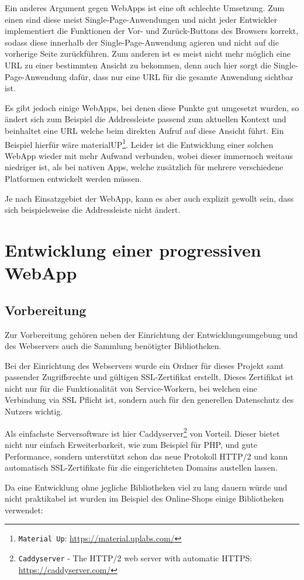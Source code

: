 \documentclass[a4paper,12pt,ngerman,listof=numbered]{scrartcl}      %
\providecommand{\inlinecode}[1]{\texttt{#1}}
\begin{document}
	Ein anderes Argument gegen WebApps ist eine oft schlechte Umsetzung. Zum einen sind diese meist Single-Page-Anwendungen und nicht jeder Entwickler implementiert die Funktionen der Vor- und Zurück-Buttons des Browsers korrekt, sodass diese innerhalb der Single-Page-Anwendung agieren und nicht auf die vorherige Seite zurückführen. Zum anderen ist es meist nicht mehr möglich eine URL zu einer bestimmten Ansicht zu bekommen, denn auch hier sorgt die Single-Page-Anwendung dafür, dass nur eine URL für die gesamte Anwendung sichtbar ist.\par
	Es gibt jedoch einige WebApps, bei denen diese Punkte gut umgesetzt wurden, so ändert sich zum Beispiel die Addressleiste passend zum aktuellen Kontext und beinhaltet eine URL welche beim direkten Aufruf auf diese Ansicht führt. Ein Beispiel hierfür wäre materialUP\footnote{\inlinecode{Material Up}: \url{https://material.uplabs.com/}}. Leider ist die Entwicklung einer solchen WebApp wieder mit mehr Aufwand verbunden, wobei dieser immernoch weitaus niedriger ist, als bei nativen Apps, welche zusätzlich für mehrere verschiedene Platformen entwickelt werden müssen.\par
	Je nach Einsatzgebiet der WebApp, kann es aber auch explizit gewollt sein, dass sich beispielsweise die Addressleiste nicht ändert.\par
	
	\section{Entwicklung einer progressiven WebApp}
	\subsection{Vorbereitung}
	Zur Vorbereitung gehören neben der Einrichtung der Entwicklungsumgebung und des Webservers auch die Sammlung benötigter Bibliotheken.\par
	Bei der Einrichtung des Webservers wurde ein Ordner für dieses Projekt samt passender Zugriffsrechte und gültigen SSL-Zertifikat erstellt. Dieses Zertifikat ist nicht nur für die Funktionalität von Service-Workern, bei welchen eine Verbindung via SSL Pflicht ist, sondern auch für den generellen Datenschutz des Nutzers wichtig.\par
	Als einfachste Serversoftware ist hier Caddyserver\footnote{\inlinecode{Caddyserver} - The HTTP/2 web server with automatic HTTPS: \url{https://caddyserver.com/}} von Vorteil. Dieser bietet nicht nur einfach Erweiterbarkeit, wie zum Beispiel für PHP, und gute Performance, sondern unterstützt schon das neue Protokoll HTTP/2 und kann automatisch SSL-Zertifikate für die eingerichteten Domains austellen lassen.\par
	Da eine Entwicklung ohne jegliche Bibliotheken viel zu lang dauern würde und nicht praktikabel ist wurden im Beispiel des Online-Shops einige Bibliotheken verwendet:\par
	
\end{document}
